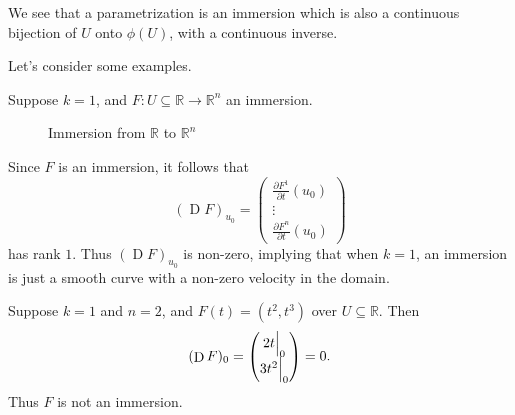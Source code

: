 \documentclass[notoc,notitlepage]{tufte-book}
\DeclareMathOperator{\D}{D}
\begin{document}
\begin{note}
  We see that a parametrization is an immersion which is also a continuous
  bijection of $U$ onto $\phi(U)$, with a continuous inverse.
\end{note}

Let's consider some examples.

\begin{eg}
  Suppose $k = 1$, and $F : U \subseteq \mathbb{R} \to \mathbb{R}^n$ an
  immersion.
  \begin{figure*}[ht]
    \centering
    \caption{Immersion from $\mathbb{R}$ to $\mathbb{R}^n$}
    \label{fig:immersion_from_r_to_r_n_}
  \end{figure*}

  Since $F$ is an immersion, it follows that
  \begin{equation*}
    (\D F)_{u_0} = \begin{pmatrix}
      \frac{\partial F^1}{\partial t}(u_0) \\
      \vdots \\
      \frac{\partial F^n}{\partial t}(u_0)
    \end{pmatrix}
  \end{equation*}
  has rank $1$. Thus $(\D F)_{u_0}$ is non-zero, implying that when $k =
  1$, an immersion is just a smooth curve with a non-zero velocity in the
  domain.
\end{eg}

\begin{eg}
  Suppose $k = 1$ and $n = 2$, and $F(t) = (t^2, t^3)$ over $U \subseteq
  \mathbb{R}$. Then
  \begin{equation*}
    (\D F)_0 = \begin{pmatrix}
      2t \at{0}{} \\ 3t^2 \at{0}{}
    \end{pmatrix} = 0.
  \end{equation*}
  Thus $F$ is not an immersion.
\end{eg}
\end{document}

